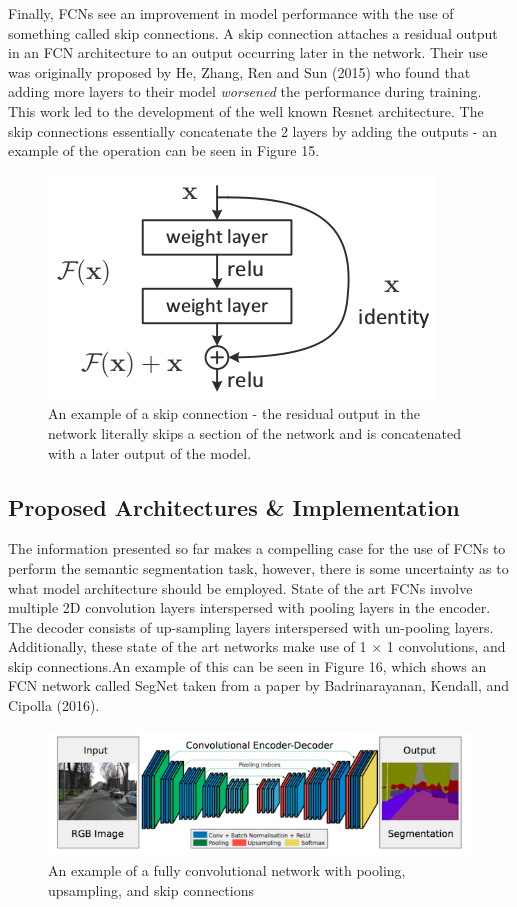\documentclass[a4paper]{article}
\begin{document}
Finally, FCNs see an improvement in model performance with the use of something called skip connections. A skip connection attaches a residual output in an FCN architecture to an output occurring later in the network. Their use was originally proposed by He, Zhang, Ren and Sun (2015) who found that adding more layers to their model \textit{worsened} the performance during training. This work led to the development of the well known Resnet architecture. The skip connections essentially concatenate the 2 layers by adding the outputs - an example of the operation can be seen in Figure 15.
\begin{figure}[h]
\centering
\includegraphics[scale=0.5]{skip}
\caption{An example of a skip connection - the residual output in the network literally skips a section of the network and is concatenated with a later output of the model.}
\end{figure}

\subsection{Proposed Architectures \& Implementation}
The information presented so far makes a compelling case for the use of FCNs to perform the semantic segmentation task, however, there is some uncertainty as to what model architecture should be employed. State of the art FCNs involve multiple 2D convolution layers interspersed with pooling layers in the encoder. The decoder consists of up-sampling layers interspersed with un-pooling layers. Additionally, these state of the art networks make use of 1 $\times$ 1 convolutions, and skip connections.An example of this can be seen in Figure 16, which shows an FCN network called SegNet taken from a paper by Badrinarayanan, Kendall, and Cipolla (2016).
\begin{figure}[h]
\centering
\includegraphics[scale=0.6]{segnet}
\caption{An example of a fully convolutional network with pooling, upsampling, and skip connections}
\end{figure}
\end{document}
